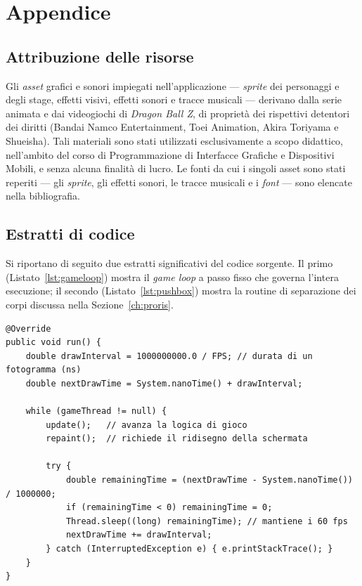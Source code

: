 \documentclass[12pt,a4paper]{report}
\begin{document}
\chapter{Appendice}\label{ch:app}

\section{Attribuzione delle risorse}
Gli \emph{asset} grafici e sonori impiegati nell'applicazione --- \emph{sprite} dei personaggi e degli stage, effetti visivi, effetti sonori e tracce musicali --- derivano dalla serie animata e dai videogiochi di \emph{Dragon Ball Z}, di proprietà dei rispettivi detentori dei diritti (Bandai Namco Entertainment, Toei Animation, Akira Toriyama e Shueisha). Tali materiali sono stati utilizzati esclusivamente a scopo didattico, nell'ambito del corso di Programmazione di Interfacce Grafiche e Dispositivi Mobili, e senza alcuna finalità di lucro. Le fonti da cui i singoli asset sono stati reperiti --- gli \emph{sprite}, gli effetti sonori, le tracce musicali e i \emph{font} --- sono elencate nella bibliografia.

\section{Estratti di codice}
Si riportano di seguito due estratti significativi del codice sorgente. Il primo (Listato~\ref{lst:gameloop}) mostra il \emph{game loop} a passo fisso che governa l'intera esecuzione; il secondo (Listato~\ref{lst:pushbox}) mostra la routine di separazione dei corpi discussa nella Sezione~\ref{ch:proris}.

\begin{lstlisting}[style=java, caption={Il \emph{game loop} a 60 fotogrammi al secondo (\texttt{GamePanel.run()}).}, label=lst:gameloop]
@Override
public void run() {
    double drawInterval = 1000000000.0 / FPS; // durata di un fotogramma (ns)
    double nextDrawTime = System.nanoTime() + drawInterval;

    while (gameThread != null) {
        update();   // avanza la logica di gioco
        repaint();  // richiede il ridisegno della schermata

        try {
            double remainingTime = (nextDrawTime - System.nanoTime()) / 1000000;
            if (remainingTime < 0) remainingTime = 0;
            Thread.sleep((long) remainingTime); // mantiene i 60 fps
            nextDrawTime += drawInterval;
        } catch (InterruptedException e) { e.printStackTrace(); }
    }
}
\end{lstlisting}
\end{document}
